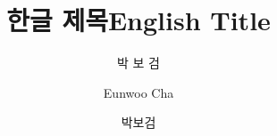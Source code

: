 \documentclass[master, english]{pnuthesis}
\title[korean]{한글 제목}
\title[english]{English Title}
\author[korean]{박 보 검}
\author[english]{Eunwoo Cha}
\author[nospace]{박보검}
\begin{document}
\renewcommand{\baselinestretch}{1.5}    %
\selectfont                             %

\changepage{5mm}{}{}{}{}{}{}{}{-5mm}    %
\makelists   %


%
%

\begin{thebibliography}{00}
\end{thebibliography}

\appendix %

\pagebreak
\acknowledgement %
\end{document}
